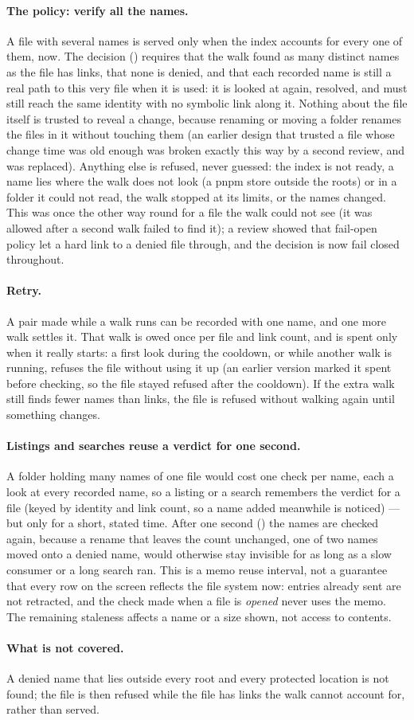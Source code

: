 \paragraph{The policy: verify all the names.}  A file with several names is served only
when the index accounts for every one of them, now.  The decision
() requires that the walk found as many distinct names as the file has
links, that none is denied, and that each recorded name is still a real path to this very
file when it is used: it is looked at again, resolved, and must still reach the same
identity with no symbolic link along it.  Nothing about the file itself is trusted to
reveal a change, because renaming or moving a folder renames the files in it without
touching them (an earlier design that trusted a file whose change time was old enough
was broken exactly this way by a second review, and was replaced).  Anything else is
refused, never guessed: the index is not ready, a name lies where the walk does not look
(a pnpm store outside the roots) or in a folder it could not read, the walk stopped at its
limits, or the names changed.  This was once the other way round for a file the walk
could not see (it was allowed after a second walk failed to find it); a review showed
that fail-open policy let a hard link to a denied file through, and the decision is now
fail closed throughout.

\paragraph{Retry.}  A pair made while a walk runs can be recorded with one name, and one
more walk settles it.  That walk is owed once per file and link count, and is spent only
when it really starts: a first look during the cooldown, or while another walk is
running, refuses the file without using it up (an earlier version marked it spent
before checking, so the file stayed refused after the cooldown).  If the extra walk still
finds fewer names than links, the file is refused without walking again until something
changes.

\paragraph{Listings and searches reuse a verdict for one second.}  A folder holding many
names of one file would cost one check per name, each a look at every recorded name, so a
listing or a search remembers the verdict for a file (keyed by identity and link count,
so a name added meanwhile is noticed) --- but only for a short, stated time.  After one
second () the names are checked again, because a rename that leaves the
count unchanged, one of two names moved onto a denied name, would otherwise stay
invisible for as long as a slow consumer or a long search ran.  This is a memo reuse
interval, not a guarantee that every row on the screen reflects the file system
now: entries already sent are not retracted, and the check made when a file is
\emph{opened} never uses the memo.  The remaining staleness affects a name or a size
shown, not access to contents.

\paragraph{What is not covered.}  A denied name that lies outside every root and every
protected location is not found; the file is then refused while the file has links the
walk cannot account for, rather than served.
